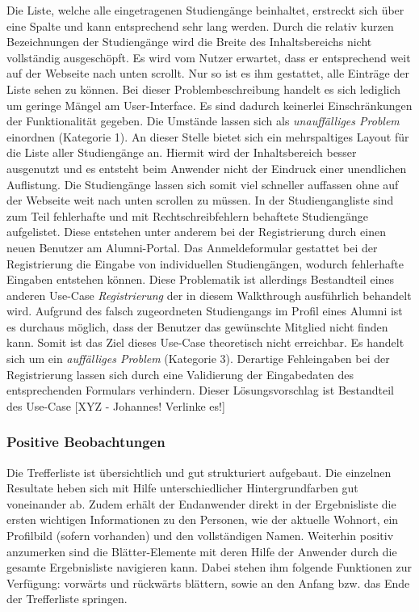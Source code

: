 {
	Die Liste, welche alle eingetragenen Studiengänge beinhaltet, erstreckt sich über eine Spalte und kann entsprechend sehr lang werden. Durch die relativ kurzen Bezeichnungen der Studiengänge wird die Breite des Inhaltsbereichs nicht vollständig ausgeschöpft. Es wird vom Nutzer erwartet, dass er entsprechend weit auf der Webseite nach unten scrollt. Nur so ist es ihm gestattet, alle Einträge der Liste sehen zu können.
}
{
	Bei dieser Problembeschreibung handelt es sich lediglich um geringe Mängel am User-Interface. Es sind dadurch keinerlei Einschränkungen der Funktionalität gegeben. Die Umstände lassen sich als \emph{unauffälliges Problem} einordnen (Kategorie 1).
}
{
	An dieser Stelle bietet sich ein mehrspaltiges Layout für die Liste aller Studiengänge an. Hiermit wird der Inhaltsbereich besser ausgenutzt und es entsteht beim Anwender nicht der Eindruck einer unendlichen Auflistung. Die Studiengänge lassen sich somit viel schneller auffassen ohne auf der Webseite weit nach unten scrollen zu müssen.
}
{In der Studiengangliste sind zum Teil fehlerhafte und mit Rechtschreibfehlern behaftete Studiengänge aufgelistet. Diese entstehen unter anderem bei der Registrierung durch einen neuen Benutzer am Alumni-Portal. Das Anmeldeformular gestattet bei der Registrierung die Eingabe von individuellen Studiengängen, wodurch fehlerhafte Eingaben entstehen können. Diese Problematik ist allerdings Bestandteil eines anderen Use-Case \emph{Registrierung} der in diesem Walkthrough ausführlich behandelt wird.
}
{Aufgrund des falsch zugeordneten Studiengangs im Profil eines Alumni ist es durchaus möglich, dass der Benutzer das gewünschte Mitglied nicht finden kann. Somit ist das Ziel dieses Use-Case theoretisch nicht erreichbar. Es handelt sich um ein \emph{auffälliges Problem} (Kategorie 3).
}
{Derartige Fehleingaben bei der Registrierung lassen sich durch eine Validierung der Eingabedaten des entsprechenden Formulars verhindern. Dieser Lösungsvorschlag ist Bestandteil des Use-Case [XYZ - Johannes! Verlinke es!]
}


\subsubsection*{Positive Beobachtungen}
Die Trefferliste ist übersichtlich und gut strukturiert aufgebaut. Die einzelnen Resultate heben sich mit Hilfe unterschiedlicher Hintergrundfarben gut voneinander ab. Zudem erhält der Endanwender direkt in der Ergebnisliste die ersten wichtigen Informationen zu den Personen, wie der aktuelle Wohnort, ein Profilbild (sofern vorhanden) und den vollständigen Namen. Weiterhin positiv anzumerken sind die Blätter-Elemente mit deren Hilfe der Anwender durch die gesamte Ergebnisliste navigieren kann. Dabei stehen ihm folgende Funktionen zur Verfügung: vorwärts und rückwärts blättern, sowie an den Anfang bzw. das Ende der Trefferliste springen. 

